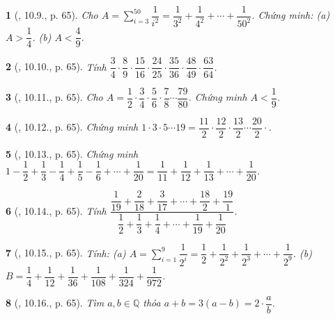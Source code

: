 \documentclass{article}
\newtheorem{baitoan}{}
\begin{document}
\begin{baitoan}[\cite{TLCT_THCS_Toan_6_so_hoc}, 10.9., p. 65]
	Cho $A = \sum_{i=3}^{50} \dfrac{1}{i^2} = \dfrac{1}{3^2} + \dfrac{1}{4^2} + \cdots + \dfrac{1}{50^2}$. Chứng minh: (a) $A > \dfrac{1}{4}$. (b) $A < \dfrac{4}{9}$.
\end{baitoan}

\begin{baitoan}[\cite{TLCT_THCS_Toan_6_so_hoc}, 10.10., p. 65]
	Tính $\dfrac{3}{4}\cdot\dfrac{8}{9}\cdot\dfrac{15}{16}\cdot\dfrac{24}{25}\cdot\dfrac{35}{36}\cdot\dfrac{48}{49}\cdot\dfrac{63}{64}$.
\end{baitoan}

\begin{baitoan}[\cite{TLCT_THCS_Toan_6_so_hoc}, 10.11., p. 65]
	Cho $A = \dfrac{1}{2}\cdot\dfrac{3}{4}\cdot\dfrac{5}{6}\cdot\dfrac{7}{8}\cdots\dfrac{79}{80}$. Chứng minh $A < \dfrac{1}{9}$.
\end{baitoan}

\begin{baitoan}[\cite{TLCT_THCS_Toan_6_so_hoc}, 10.12., p. 65]
	Chứng minh $1\cdot3\cdot5\cdots19 = \dfrac{11}{2}\cdot\dfrac{12}{2}\cdot\dfrac{13}{2}\cdots\dfrac{20}{2}\cdot$.
\end{baitoan}

\begin{baitoan}[\cite{TLCT_THCS_Toan_6_so_hoc}, 10.13., p. 65]
	Chứng minh $1 - \dfrac{1}{2} + \dfrac{1}{3} - \dfrac{1}{4} + \dfrac{1}{5} - \dfrac{1}{6} + \cdots + \dfrac{1}{20} = \dfrac{1}{11} + \dfrac{1}{12} + \dfrac{1}{13} + \cdots + \dfrac{1}{20}$.
\end{baitoan}

\begin{baitoan}[\cite{TLCT_THCS_Toan_6_so_hoc}, 10.14., p. 65]
	Tính $\dfrac{\dfrac{1}{19} + \dfrac{2}{18} + \dfrac{3}{17} + \cdots + \dfrac{18}{2} + \dfrac{19}{1}}{\dfrac{1}{2} + \dfrac{1}{3} + \dfrac{1}{4} + \cdots + \dfrac{1}{19} + \dfrac{1}{20}}$.
\end{baitoan}

\begin{baitoan}[\cite{TLCT_THCS_Toan_6_so_hoc}, 10.15., p. 65]
	Tính: (a) $A = \sum_{i=1}^9 \dfrac{1}{2^i} = \dfrac{1}{2} + \dfrac{1}{2^2} + \dfrac{1}{2^3} + \cdots + \dfrac{1}{2^9}$. (b) $B = \dfrac{1}{4} + \dfrac{1}{12} + \dfrac{1}{36} + \dfrac{1}{108} + \dfrac{1}{324} + \dfrac{1}{972}$.
\end{baitoan}

\begin{baitoan}[\cite{TLCT_THCS_Toan_6_so_hoc}, 10.16., p. 65]
	Tìm $a,b\in\mathbb{Q}$ thỏa $a + b = 3(a - b) = 2\cdot\dfrac{a}{b}$.
\end{baitoan}
\end{document}
